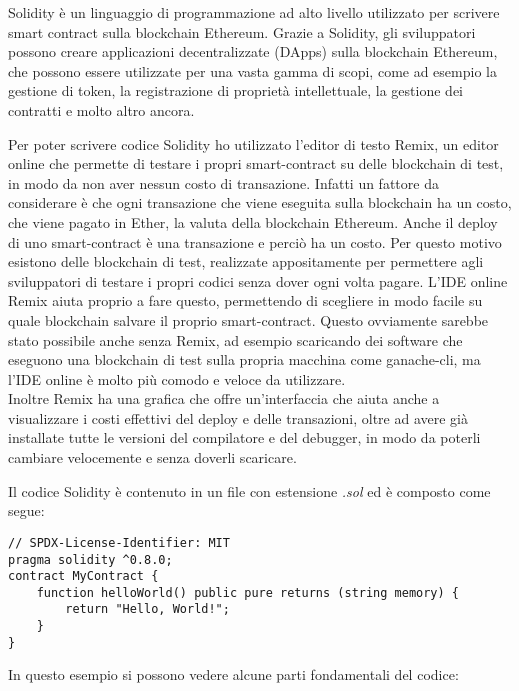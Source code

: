 Solidity è un linguaggio di programmazione ad alto livello utilizzato per
scrivere smart contract sulla blockchain Ethereum. Grazie a Solidity, gli
sviluppatori possono creare applicazioni decentralizzate (DApps) sulla
blockchain Ethereum, che possono essere utilizzate per una vasta gamma di
scopi, come ad esempio la gestione di token, la registrazione di proprietà
intellettuale, la gestione dei contratti e molto altro ancora.

Per poter scrivere codice Solidity ho utilizzato l'editor di testo Remix, 
un editor online che permette di testare i propri smart-contract su delle 
blockchain di test, in modo da non aver nessun costo di transazione.
Infatti un fattore da considerare è che ogni transazione che viene eseguita
sulla blockchain ha un costo, che viene pagato in Ether, la valuta della
blockchain Ethereum. Anche il deploy di uno smart-contract è una transazione
e perciò ha un costo. Per questo motivo esistono delle blockchain di test,
realizzate appositamente per permettere agli sviluppatori di testare i propri
codici senza dover ogni volta pagare. L'IDE online Remix aiuta proprio a fare
questo, permettendo di scegliere in modo facile su quale blockchain salvare
il proprio smart-contract. Questo ovviamente sarebbe stato possibile anche
senza Remix, ad esempio scaricando dei software che eseguono
una blockchain di test sulla propria macchina come ganache-cli, ma l'IDE
online è molto più comodo e veloce da utilizzare. \\
Inoltre Remix ha una grafica che offre un'interfaccia che aiuta anche a 
visualizzare i costi effettivi del deploy e delle transazioni, oltre ad avere
già installate tutte le versioni del compilatore e del debugger, in modo 
da poterli cambiare velocemente e senza doverli scaricare.

Il codice Solidity è contenuto in un file con estensione \textit{.sol} ed
è composto come segue:
\begin{lstlisting}[language=Solidity]
// SPDX-License-Identifier: MIT
pragma solidity ^0.8.0;
contract MyContract {
    function helloWorld() public pure returns (string memory) {
        return "Hello, World!";
    }
}
\end{lstlisting}
In questo esempio si possono vedere alcune parti fondamentali del codice:

